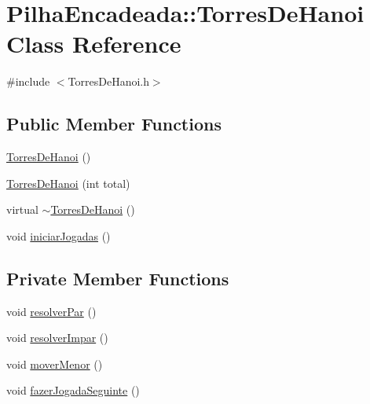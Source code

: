 \hypertarget{classPilhaEncadeada_1_1TorresDeHanoi}{
\section{PilhaEncadeada::TorresDeHanoi Class Reference}
\label{classPilhaEncadeada_1_1TorresDeHanoi}
}


{\ttfamily \#include $<$TorresDeHanoi.h$>$}

\subsection*{Public Member Functions}
\begin{DoxyCompactItemize}
\item 
\hyperlink{classPilhaEncadeada_1_1TorresDeHanoi_a43363acfbc0954d34b1046b62b89f7a2}{TorresDeHanoi} ()
\item 
\hyperlink{classPilhaEncadeada_1_1TorresDeHanoi_a2c5df6b93bb13d79c257930a4ba8fb09}{TorresDeHanoi} (int total)
\item 
virtual \hyperlink{classPilhaEncadeada_1_1TorresDeHanoi_ad8bc0337e70a7c9b98af485fbcc93234}{$\sim$TorresDeHanoi} ()
\item 
void \hyperlink{classPilhaEncadeada_1_1TorresDeHanoi_a26d82e0d98a947737b189475e5be9743}{iniciarJogadas} ()
\end{DoxyCompactItemize}
\subsection*{Private Member Functions}
\begin{DoxyCompactItemize}
\item 
void \hyperlink{classPilhaEncadeada_1_1TorresDeHanoi_aa73dfcd464d063d92306299bda99282e}{resolverPar} ()
\item 
void \hyperlink{classPilhaEncadeada_1_1TorresDeHanoi_ac02df48481855b7cce4ce5917d63fdc0}{resolverImpar} ()
\item 
void \hyperlink{classPilhaEncadeada_1_1TorresDeHanoi_af538b5b7d828d48bf44d2c26e77ba255}{moverMenor} ()
\item 
void \hyperlink{classPilhaEncadeada_1_1TorresDeHanoi_a0d1ae229f02212eff7880042b9d50ad0}{fazerJogadaSeguinte} ()
\end{DoxyCompactItemize}
